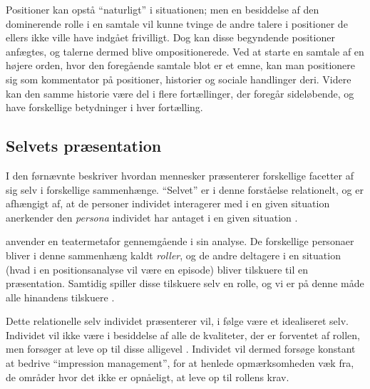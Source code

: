 

Positioner kan opstå “naturligt” i situationen; men en besiddelse 
af den dominerende rolle i en samtale vil kunne tvinge de andre 
talere i positioner de ellers ikke ville have indgået frivilligt. 
Dog kan disse begyndende positioner anfægtes, og talerne dermed 
blive ompositionerede. Ved at starte en samtale af en højere 
orden, hvor den foregående samtale blot er et emne, kan man 
positionere sig som kommentator på positioner, historier og 
sociale handlinger deri. Videre kan den samme historie være del i
flere fortællinger, der foregår sideløbende, og have forskellige 
betydninger i hver fortælling.

\subsection{Selvets præsentation}

I den førnævnte  
beskriver \citeauthor{goffmanPresentationSelfEveryday1956} hvordan 
mennesker præsenterer forskellige facetter af sig selv i 
forskellige sammenhænge. “Selvet” er i denne forståelse 
relationelt, og er afhængigt af, at de personer individet 
interagerer med i en given situation anerkender den \emph{persona} 
individet har antaget i en given situation \autocite[s.  
???]{goffmanPresentationSelfEveryday1956}.

\citeauthor{goffmanPresentationSelfEveryday1956} anvender en 
teatermetafor gennemgående i sin analyse. De forskellige personaer 
bliver i denne sammenhæng kaldt \emph{roller}, og de andre 
deltagere i en situation (hvad i en positionsanalyse vil være en 
episode) bliver tilskuere til en præsentation. Samtidig spiller 
disse tilskuere selv en rolle, og vi er på denne måde alle 
hinandens tilskuere \autocite[s. 
???]{goffmanPresentationSelfEveryday1956}.

Dette relationelle selv individet præsenterer vil, i følge 
\citeauthor{goffmanPresentationSelfEveryday1956} være et 
idealiseret selv. Individet vil ikke være i besiddelse af alle de 
kvaliteter, der er forventet af rollen, men forsøger at leve op 
til disse alligevel \citeyear[s. 
???]{goffmanPresentationSelfEveryday1956}. Individet vil dermed 
forsøge konstant at bedrive “impression management”, for at 
henlede opmærksomheden væk fra, de områder hvor det ikke er 
opnåeligt, at leve op til rollens krav.

